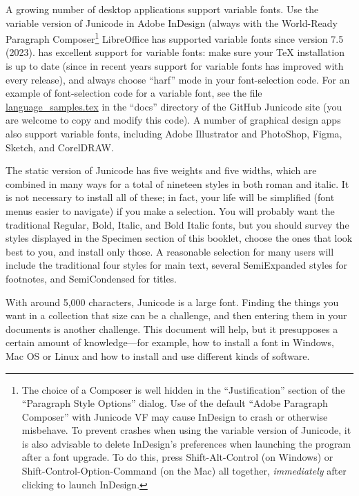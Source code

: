 A growing number of desktop applications support variable fonts. Use the variable version of
Junicode in Adobe InDesign (always with the World-Ready Paragraph Composer\footnote{%
The choice of a Composer is well hidden in the “Justification” section of the
“Paragraph Style Options” dialog. Use of the default “Adobe Paragraph Composer”
with Junicode VF may cause InDesign to crash or otherwise misbehave. To prevent crashes
when using the variable version of Junicode,
it is also advisable to delete InDesign's preferences when launching the program after
a font upgrade. To do this, press Shift-Alt-Control (on Windows) or
Shift-Control-Option-Command (on the Mac) all together, \textit{immediately} after
clicking to launch InDesign.} LibreOffice
has supported variable fonts since version 7.5 (2023). {\LuaTeX} has excellent support
for variable fonts: make sure your TeX installation is up to date (since in
recent years support for variable fonts has improved with every release), and always choose “harf”
mode in your font-selection code. For an example of font-selection code for a
variable font, see the file
\href{https://github.com/psb1558/Junicode-font/blob/master/docs/language_samples.tex}%
{language\_samples.tex} in the “docs” directory of the GitHub Junicode site (you
are welcome to copy and modify this code). A number of graphical design apps 
also support variable fonts, including Adobe Illustrator and PhotoShop, Figma,
Sketch, and CorelDRAW.

The static version of Junicode has five weights and five widths, which are combined in many ways
for a total of nineteen styles in
both roman and italic. It is not necessary to install all of these; in fact,
your life will be simplified (font menus easier to navigate) if you
make a selection. You will probably want the traditional Regular, Bold, Italic, and Bold
Italic fonts, but you should survey the styles displayed in the Specimen
section of this booklet, choose the ones that look best to you, and install
only those. A reasonable selection for many users will include the traditional four
styles for main text, several SemiExpanded styles for footnotes, and
SemiCondensed for titles.

With around 5,000 characters, Junicode is a large font. Finding the things you
want in a collection that size can be a challenge, and then entering them in your
documents is another challenge. This document will help, but it
presupposes a certain amount of knowledge—for example, how to install a font in
Windows, Mac OS or Linux and how to install and use different kinds of software.


